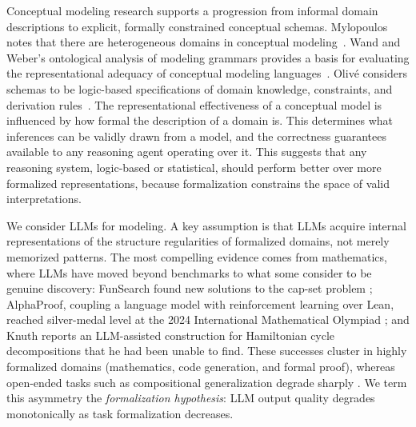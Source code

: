 \documentclass[runningheads]{llncs}
\begin{document}
Conceptual modeling research supports a progression from informal domain descriptions to explicit, formally constrained conceptual schemas. Mylopoulos 
notes that there are heterogeneous domains in conceptual modeling~\cite{mylopoulos1992conceptual}. Wand and Weber’s ontological analysis of modeling grammars provides a basis for evaluating the representational adequacy of conceptual modeling languages~\cite{DBLP:journals/isj/WandW93}. Olivé considers schemas to be logic-based specifications of domain knowledge, constraints, and derivation rules~\cite{olive2007conceptual}.
The representational effectiveness of a conceptual model is influenced by how formal the description of a domain is. This determines what inferences can be validly drawn from a model, and the correctness guarantees available to any reasoning agent operating over it. This suggests that any reasoning system, logic-based or statistical, should perform better over more formalized representations, because formalization constrains the space of valid interpretations.

We consider LLMs for modeling. A key assumption is that LLMs acquire internal representations of the structure regularities of formalized domains, not merely memorized patterns. The most compelling evidence comes from mathematics, where LLMs have moved beyond benchmarks to what some consider to be genuine discovery: FunSearch found new solutions to the cap-set problem \cite{romeraparedes2024funsearch}; AlphaProof, coupling a language model with reinforcement learning over Lean, reached silver-medal level at the 2024 International Mathematical Olympiad \cite{alphaproof2024imo}; and Knuth \cite{knuth2026claude} reports an LLM-assisted construction for Hamiltonian cycle decompositions that he had been unable to find. These successes cluster in highly formalized domains (mathematics,
code generation,
and formal proof), whereas open-ended tasks such as compositional generalization degrade sharply \cite{dziri2023faith}. We term this asymmetry the \emph{formalization hypothesis}: LLM output quality degrades monotonically as task formalization decreases.
\end{document}
